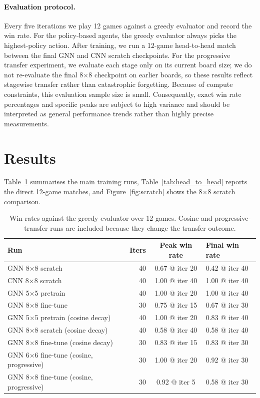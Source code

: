 \documentclass{article}
\begin{document}
\paragraph{Evaluation protocol.}
Every five iterations we play 12 games against a greedy evaluator and record the win rate.
For the policy-based agents, the greedy evaluator always picks the highest-policy action.
After training, we run a 12-game head-to-head match between the final GNN and CNN scratch
checkpoints.
For the progressive transfer experiment, we evaluate each stage only on its current board size; we
do not re-evaluate the final 8$\times$8 checkpoint on earlier boards, so these results reflect
stagewise transfer rather than catastrophic forgetting.
Because of compute constraints, this evaluation sample size is small. Consequently, exact win rate percentages and specific peaks are subject to high
variance and should be interpreted as general performance trends rather than highly precise measurements.

\section{Results}

Table~\ref{tab:results} summarises the main training runs, Table~\ref{tab:head_to_head} reports
the direct 12-game matches, and Figure~\ref{fig:scratch} shows the 8$\times$8 scratch comparison.

\begin{table}[t]
\centering
\small
\begin{tabular}{lrcl}
\toprule
Run & Iters & Peak win rate & Final win rate \\
\midrule
GNN 8$\times$8 scratch                  & 40 & 0.67 @ iter 20 & 0.42 @ iter 40 \\
CNN 8$\times$8 scratch                  & 40 & 1.00 @ iter 40 & 1.00 @ iter 40 \\
GNN 5$\times$5 pretrain                 & 40 & 1.00 @ iter 20 & 1.00 @ iter 40 \\
GNN 8$\times$8 fine-tune                & 30 & 0.75 @ iter 15 & 0.67 @ iter 30 \\
GNN 5$\times$5 pretrain (cosine decay)  & 40 & 1.00 @ iter 20 & 0.83 @ iter 40 \\
GNN 8$\times$8 scratch (cosine decay)   & 40 & 0.58 @ iter 40 & 0.58 @ iter 40 \\
GNN 8$\times$8 fine-tune (cosine decay) & 30 & 0.83 @ iter 15 & 0.83 @ iter 30 \\
GNN 6$\times$6 fine-tune (cosine, progressive) & 30 & 1.00 @ iter 20 & 0.92 @ iter 30 \\
GNN 8$\times$8 fine-tune (cosine, progressive) & 30 & 0.92 @ iter 5 & 0.58 @ iter 30 \\
\bottomrule
\end{tabular}
\caption{Win rates against the greedy evaluator over 12 games. Cosine and progressive-transfer runs
are included because they change the transfer outcome.}
\label{tab:results}
\end{table}
\end{document}
